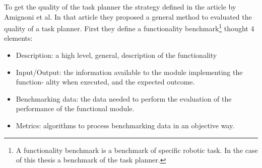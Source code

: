 To get the quality of the task planner the strategy defined in the article \citep{Benchmarking} by Amignoni et al. In that article they proposed a general method to evaluated the quality of a task planner. 
First they define a functionality benchmark\footnote{A functionality benchmark is a benchmark of specific robotic task. In the case of this thesis a benchmark of the task planner.} thought 4 elements:
\begin{itemize}
\item Description: a high level, general, description of the functionality
\item Input/Output: the information available to the module implementing the function-
ality when executed, and the expected outcome.
\item Benchmarking data: the data needed to perform the evaluation of the performance
of the functional module.
\item Metrics: algorithms to process benchmarking data in an objective way.
\end{itemize}

